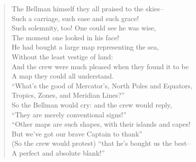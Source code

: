 {
\ssp
\begin{verse}
The Bellman himself they all praised to the skies--\\
Such a carriage, such ease and such grace!\\
Such solemnity, too! One could see he was wise,\\
The moment one looked in his face!\\
 \vspace{.15in}
He had bought a large map representing the sea,\\
Without the least vestige of land:\\
And the crew were much pleased when they found it to be\\
A map they could all understand.\\
 \vspace{.15in}
``What's the good of Mercator's, North Poles and Equators,\\
Tropics, Zones, and Meridian Lines?''\\
So the Bellman would cry: and the crew would reply,\\
``They are merely conventional signs!''\\
 \vspace{.15in}
``Other maps are such shapes, with their islands and capes!\\
But we've got our brave Captain to thank''\\
(So the crew would protest) ``that he's bought us the best--\\
A perfect and absolute blank!''\\
\end{verse}
}

